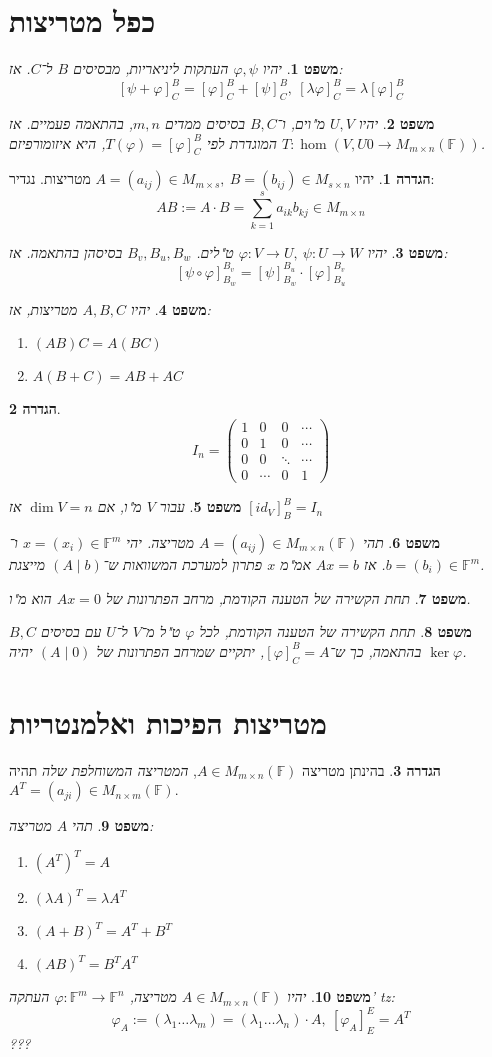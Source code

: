 \documentclass[]{article}
\newcommand\F         {\mathbb{F}}
\newcommand\co        {\colon}
\newcommand\pms[1]    {\begin{pmatrix}
		#1
\end{pmatrix}}
\renewcommand\lg      {\lambda}
\renewcommand\phi     {\varphi}
\newtheorem{Theorem}{משפט}
\theoremstyle{definition}
\newtheorem{definition}{הגדרה}
\newcommand\theo  [1] {\begin{Theorem}#1\end{Theorem}}
\newcommand\defi  [1] {\begin{definition}#1\end{definition}}
\begin{document}
\begin{multicols}{2}
		\section{כפל מטריצות}
		\theo{יהיו $\phi, \psi$ העתקות ליניאריות, מבסיסים $B$ ל־$C$. אז: 
			\[ [\psi + \phi]_C^B = [\phi]_C^B + [\psi]_C^B, \ [\lg\phi]_C^B = \lg[\phi]_C^B \]}
		\theo{יהיו $U, V$ מ"וים, ו־$B, C$ בסיסים ממדים $m, n$, בהתאמה פעמיים. אז $T \co \hom(V, U0 \to M_{m \times n}(\F))$ המוגדרת לפי $T(\phi) = [\phi]_C^B$, היא איזומורפיזם. }
		\defi{יהיו $A = (a_{ij}) \in M_{m \times s}, \ B = (b_{ij}) \in M_{s \times n}$ מטריצות. נגדיר: 
		\[ AB := A \cdot B = \sum_{k = 1}^{s}a_{ik}b_{kj} \in M_{m \times n} \]}
		\theo{יהיו $\phi \co V \to U, \ \psi \co U \to W$ ט"לים. $B_v, B_u, B_w$ בסיסהן בהתאמה. אז: 
		\[ [\psi \circ \phi]_{B_w}^{B_v} = [\psi]_{B_w}^{B_u} \cdot [\phi]_{B_u}^{B_v} \]}
		\theo{יהיו $A, B, C$ מטריצות, אז: 
		\begin{enumerate}
			\item \hfil $(AB)C = A(BC)$
			\item \hfil $A(B + C) = AB + AC$
		\end{enumerate}}
		\defi{
		\[ I_n = \pms{1 & 0 & 0 & \cdots \\ 0 & 1 & 0 & \cdots \\ 0 & 0 & \ddots & \cdots \\ 0 & \cdots & 0 & 1} \]}
		\theo{עבור $V$ מ"ו, אם $\dim V = n$ אז $[id_V]^B_B = I_n$}
		\theo{תהי $A = (a_{ij}) \in M_{m \times n}(\F)$ מטריצה. יהי $x = (x_i) \in \F^m$ ו־$b = (b_i) \in \F^m$. אז $Ax = b$ אמ"מ $x$ פתרון למערכת המשוואות ש־$(A \mid b)$ מייצגת. }
		\theo{תחת הקשירה של הטענה הקודמת, מרחב הפתרונות של $Ax = 0$ הוא מ"ו. }
		\theo{תחת הקשירה של הטענה הקודמת, לכל $\phi$ ט"ל מ־$V$ ל־$U$ עם בסיסים $B, C$ בהתאמה, כך ש־$[\phi]_C^B = A$, יתקיים שמרחב הפתרונות של $(A \mid 0)$ יהיה $\ker \phi$. }
		
		\section{מטריצות הפיכות ואלמנטריות}
		\defi{בהינתן מטריצה $A \in M_{m \times n}(\F)$, \textit{המטריצה המשוחלפת שלה} תהיה 
		$A^T = (a_{ji}) \in M_{n \times m}(\F)$. }
		\theo{תהי $A$ מטריצה: 
		\begin{enumerate}
			\item \hfil $(A^T)^T = A$
			\item \hfil $(\lg A)^T = \lg A^T$
			\item \hfil $(A + B)^T = A^T + B^T$
			\item \hfil $(AB)^T = B^TA^T$
		\end{enumerate}}
		\theo{יהיו $A \in M_{m \times n}(\F)$ מטריצה, $\phi \co \F^m \to \F^n$ העתקה' tz: 
		\[ \phi_A := (\lg_1 \dots \lg_m) = (\lg_1 \dots \lg_n) \cdot A, \ [\phi_A]^E_E = A^T \] ???}
		

\end{multicols}
\end{document}
